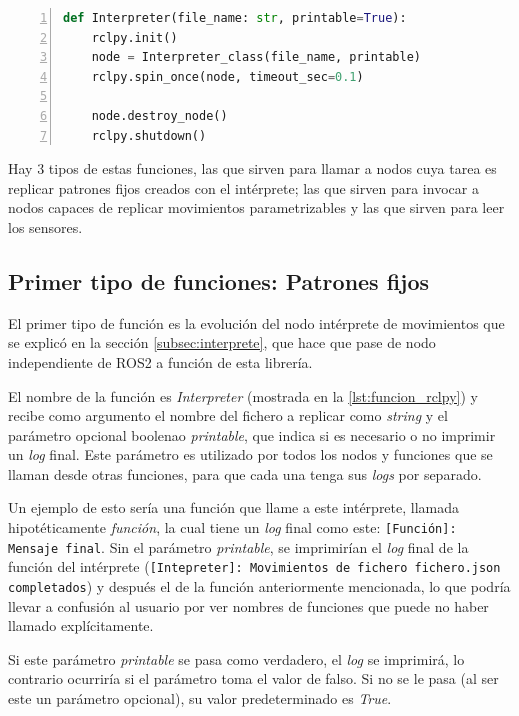 \begin{lstlisting}[language=Python, caption={Ejemplo de función que invoca un nodo ROS2}, label={lst:funcion_rclpy}, numbers=left, backgroundcolor=\color{gray!10}]    
def Interpreter(file_name: str, printable=True):
    rclpy.init()
    node = Interpreter_class(file_name, printable)
    rclpy.spin_once(node, timeout_sec=0.1)
    
    node.destroy_node()
    rclpy.shutdown()
\end{lstlisting}

Hay 3 tipos de estas funciones, las que sirven para llamar a nodos cuya tarea es replicar patrones fijos creados con el intérprete; las que sirven para invocar a nodos capaces de replicar movimientos parametrizables y las que sirven para leer los sensores.

\subsection{Primer tipo de funciones: Patrones fijos}

El primer tipo de función es la evolución del nodo intérprete de movimientos que se explicó en la sección \ref{subsec:interprete}, que hace que pase de nodo independiente de ROS2 a función de esta librería.

El nombre de la función es \textit{Interpreter} (mostrada en la \autoref{lst:funcion_rclpy}) y recibe como argumento el nombre del fichero a replicar como \textit{string} y el parámetro opcional boolenao \textit{printable}, que indica si es necesario o no imprimir un \textit{log} final. Este parámetro es utilizado por todos los nodos y funciones que se llaman desde otras funciones, para que cada una tenga sus \textit{logs} por separado. 

Un ejemplo de esto sería una función que llame a este intérprete, llamada hipotéticamente \textit{función}, la cual tiene un \textit{log} final como este: \texttt{[Función]: Mensaje final}. Sin el parámetro \textit{printable}, se imprimirían el \textit{log} final de la función del intérprete (\texttt{[Intepreter]: Movimientos de fichero fichero.json completados}) y después el de la función anteriormente mencionada, lo que podría llevar a confusión al usuario por ver nombres de funciones que puede no haber llamado explícitamente.

Si este parámetro \textit{printable} se pasa como  verdadero, el \textit{log} se imprimirá, lo contrario ocurriría si el parámetro toma el valor de falso. Si no se le pasa (al ser este un parámetro opcional), su valor predeterminado es \textit{True}.

